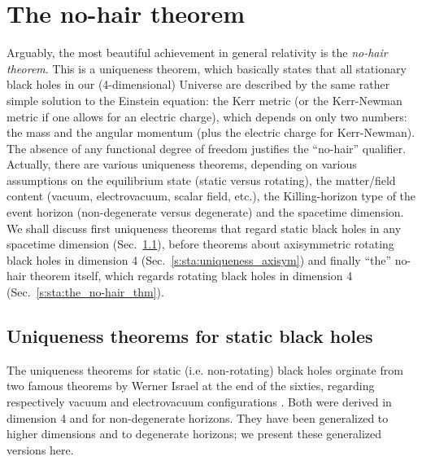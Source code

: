 
\section{The no-hair theorem} \label{s:sta:no-hair}

Arguably, the most beautiful achievement in general relativity is the
\emph{no-hair theorem}.
This is a uniqueness theorem, which basically states that all stationary black holes in our (4-dimensional) Universe are
described by the same rather simple solution to the Einstein equation: the Kerr metric
(or the Kerr-Newman metric if one allows for an electric charge), which depends on only
two numbers: the mass and the angular momentum (plus the electric charge for Kerr-Newman).
The absence of any functional degree of freedom justifies the ``no-hair'' qualifier.
Actually, there are various uniqueness theorems, depending on various assumptions
on the equilibrium state (static versus rotating),
the matter/field content (vacuum, electrovacuum, scalar field, etc.),
the Killing-horizon type of the event horizon (non-degenerate versus degenerate) and the spacetime
dimension. We shall discuss first uniqueness theorems that regard static black holes
in any spacetime dimension (Sec.~\ref{s:sta:uniqueness_static}), before
theorems about axisymmetric rotating black holes in dimension 4 (Sec.~\ref{s:sta:uniqueness_axisym})
and finally ``the'' no-hair theorem itself, which regards rotating black holes in dimension 4
(Sec.~\ref{s:sta:the_no-hair_thm}).

\subsection{Uniqueness theorems for static black holes} \label{s:sta:uniqueness_static}

The uniqueness theorems for static (i.e. non-rotating) black holes orginate from
two famous theorems by Werner Israel at the end of the sixties,
regarding respectively vacuum \cite{Israe67}
and electrovacuum configurations \cite{Israe68}. Both were derived in dimension 4
and for non-degenerate horizons. They have been generalized to higher dimensions
and to degenerate horizons; we present these generalized versions here.

